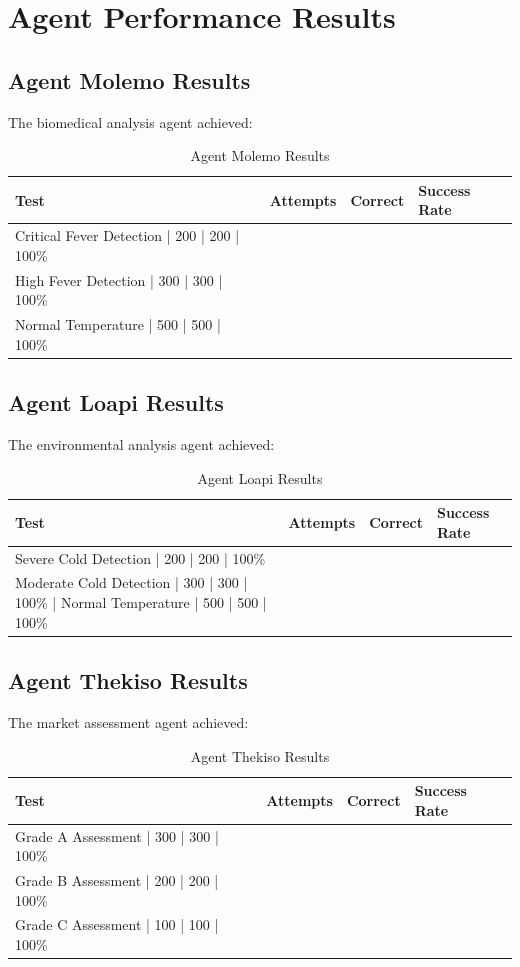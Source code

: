 \section{Agent Performance Results}

\subsection{Agent Molemo Results}

The biomedical analysis agent achieved:

\begin{table}[H]
\centering
\begin{tabular}{|l|l|l|l|}
\hline
\textbf{Test} & \textbf{Attempts} & \textbf{Correct} & \textbf{Success Rate} \\
\hline
Critical Fever Detection | 200 | 200 | 100\% \\
High Fever Detection | 300 | 300 | 100\% \\
Normal Temperature | 500 | 500 | 100\% \\
\hline
\end{tabular}
\caption{Agent Molemo Results}
\end{table}

\subsection{Agent Loapi Results}

The environmental analysis agent achieved:

\begin{table}[H]
\centering
\begin{tabular}{|l|l|l|l|}
\hline
\textbf{Test} & \textbf{Attempts} & \textbf{Correct} & \textbf{Success Rate} \\
\hline
Severe Cold Detection | 200 | 200 | 100\% \\
Moderate Cold Detection | 300 | 300 | 100\% |
Normal Temperature | 500 | 500 | 100\% \\
\hline
\end{tabular}
\caption{Agent Loapi Results}
\end{table}

\subsection{Agent Thekiso Results}

The market assessment agent achieved:

\begin{table}[H]
\centering
\begin{tabular}{|l|l|l|l|}
\hline
\textbf{Test} & \textbf{Attempts} & \textbf{Correct} & \textbf{Success Rate} \\
\hline
Grade A Assessment | 300 | 300 | 100\% \\
Grade B Assessment | 200 | 200 | 100\% \\
Grade C Assessment | 100 | 100 | 100\% \\
\hline
\end{tabular}
\caption{Agent Thekiso Results}
\end{table}

